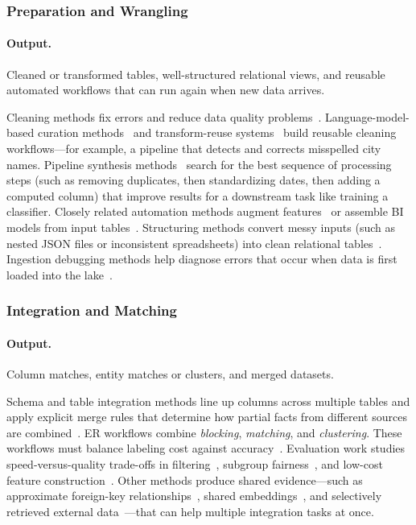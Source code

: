 \documentclass[sigconf]{acmart}
\begin{document}
\subsubsection{Preparation and Wrangling}
\paragraph{Output.} Cleaned or transformed tables, well-structured relational views, and reusable automated workflows that can run again when new data arrives.

Cleaning methods fix errors and reduce data quality problems~\cite{10.14778/3675034.3675051}. Language-model-based curation methods~\cite{10.14778/3574245.3574258,10.14778/3611540.3611624} and transform-reuse systems~\cite{10.14778/3611540.3611628} build reusable cleaning workflows---for example, a pipeline that detects and corrects misspelled city names.
Pipeline synthesis methods~\cite{10.1145/3698831,10.1145/3588945} search for the best sequence of processing steps (such as removing duplicates, then standardizing dates, then adding a computed column) that improve results for a downstream task like training a classifier. Closely related automation methods augment features~\cite{11113027} or assemble BI models from input tables~\cite{10.14778/3603581.3603596}.
Structuring methods convert messy inputs (such as nested JSON files or inconsistent spreadsheets) into clean relational tables~\cite{10.14778/3626292.3626294,10.1145/3665252.3665269,10.14778/3681954.3682019}. Ingestion debugging methods help diagnose errors that occur when data is first loaded into the lake~\cite{10.14778/3611540.3611595}.


\subsubsection{Integration and Matching}
\paragraph{Output.} Column matches, entity matches or clusters, and merged datasets.

Schema and table integration methods line up columns across multiple tables and apply explicit merge rules that determine how partial facts from different sources are combined~\cite{10.1145/3555041.3589732,10.14778/3574245.3574274,10.14778/3742728.3742757,10184612}.
ER workflows combine \emph{blocking}, \emph{matching}, and \emph{clustering}. These workflows must balance labeling cost against accuracy~\cite{10.1145/3709715,10.1145/3588722,10.1145/3588712,10.1145/3626711,10.1145/3588938}.
Evaluation work studies speed-versus-quality trade-offs in filtering~\cite{10184692}, subgroup fairness~\cite{10.14778/3611479.3611525}, and low-cost feature construction~\cite{11112979,10.14778/3681954.3681987}.
Other methods produce shared evidence---such as approximate foreign-key relationships~\cite{10.1145/3588929}, shared embeddings~\cite{10184556}, and selectively retrieved external data~\cite{10.14778/3611479.3611535,10.14778/3603581.3603602}---that can help multiple integration tasks at once.
\end{document}
